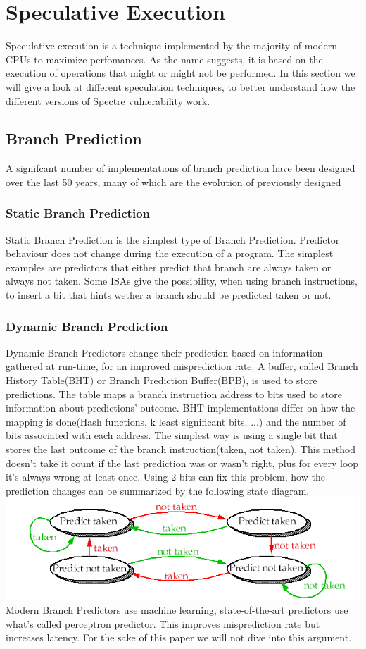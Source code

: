 \section{Speculative Execution}
Speculative execution is a technique implemented by the majority of modern CPUs to maximize perfomances. 
As the name suggests, it is based on the execution of operations that might or might not be performed.
In this section we will give a look at different speculation techniques, to better understand how the different versions of Spectre vulnerability work.

\subsection{Branch Prediction}
A signifcant number of implementations of branch prediction have been designed over the last 50 years, many of which are the evolution of previously designed 
\subsubsection{Static Branch Prediction}
Static Branch Prediction is the simplest type of Branch Prediction. Predictor behaviour does not change during the execution of a program. The simplest examples are predictors that either predict that branch are always taken or always not taken. Some ISAs give the possibility, when using branch instructions, to insert a bit that hints wether a branch should be predicted taken or not.
\subsubsection{Dynamic Branch Prediction}
Dynamic Branch Predictors change their prediction based on information gathered at run-time, for an improved misprediction rate. A buffer, called Branch History Table(BHT) or Branch Prediction Buffer(BPB), is used to store predictions.
The table maps a branch instruction address to bits used to store information about predictions' outcome. BHT implementations differ on how the mapping is done(Hash functions, k least significant bits, ...) and the number of bits associated with each address. The simplest way is using a single bit that stores the last outcome of the branch instruction(taken, not taken).
This method doesn't take it count if the last prediction was or wasn't right, plus for every loop it's always wrong at least once. Using 2 bits can fix this problem, how the prediction changes can be summarized by the following state diagram.
\includegraphics[scale=0.35]{img/2bitBHT.png}
Modern Branch Predictors use machine learning, state-of-the-art predictors use what's called perceptron predictor. This improves misprediction rate but increases latency. For the sake of this paper we will not dive into this argument.


